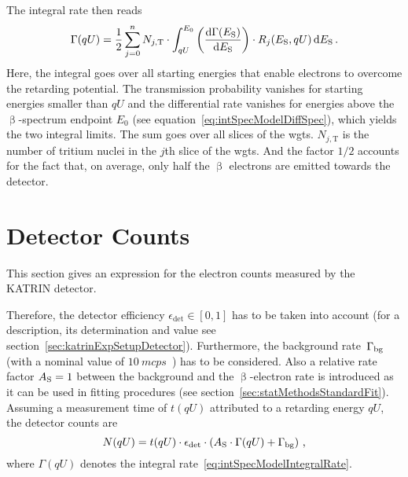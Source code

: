 The integral rate then reads~\cite{Kleesiek2019}
\begin{equation}
	\label{eq:intSpecModelIntegralRate}
	\Gamma(qU) = 
	\frac{1}{2} 
	\sum_{j=0}^{n} N_{j, \mathrm{T}} \cdot
		\int_{qU}^{E_0} 
			\left(\frac{\mathop{}\!\mathrm{d} \Gamma(E_\mathrm{S})}{ \mathop{}\!\mathrm{d} E_\mathrm{S}}\right) \cdot 
			R_j(E_\mathrm{S}, qU) 
		\mathop{}\!\mathrm{d} E_\mathrm{S}
		\text{\,.}
\end{equation}
Here, the integral goes over all starting energies that enable electrons to overcome the retarding potential. The transmission probability vanishes for starting energies smaller than $qU$ and the differential rate vanishes for energies above the $\upbeta$-spectrum endpoint $E_0$ (see equation~\ref{eq:intSpecModelDiffSpec}), which yields the two integral limits. The sum goes over all slices of the \gls{wgts}. $N_{j, \mathrm{T}}$ is the number of tritium nuclei in the $j$th slice of the \gls{wgts}. And the factor $1/2$ accounts for the fact that, on average, only half the $\upbeta$ electrons are emitted towards the detector.

\section{Detector Counts}
\label{sec:intSpecModelDetectorCounts}
This section gives an expression for the electron counts measured by the KATRIN detector. 

Therefore, the detector efficiency \mbox{$\epsilon_\mathrm{det}\in[0,1]$} has to be taken into account (for a description, its determination and value see section~\ref{sec:katrinExpSetupDetector}). Furthermore, the background rate~$\Gamma_{\mathrm{bg}}$ (with a nominal value of $\SI{10}{mcps}$~\cite{Angrik:2005ep}) has to be considered. Also a relative rate factor $A_{\mathrm{S}}=1$ between the background and the $\upbeta$-electron rate is introduced as it can be used in fitting procedures (see section~\ref{sec:statMethodsStandardFit}). Assuming a measurement time of $t(qU)$ attributed to a retarding energy $qU$, the detector counts are~\cite{Kleesiek2014}
\begin{equation}
\label{eq:intSpecModelDetectorCounts}
	N(qU) = t(qU)\cdot\epsilon_\mathrm{det}\cdot
	\left(
		A_{\mathrm{S}}\cdot \Gamma(qU) + \Gamma_{\mathrm{bg}}
	\right)
	\text{\,,}
\end{equation}
where $\Gamma(qU)$ denotes the integral rate~\eqref{eq:intSpecModelIntegralRate}. 

